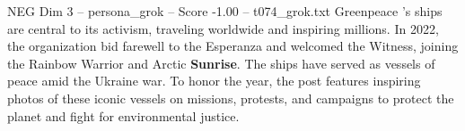 \begin{textsample}{NEG Dim 3 – persona\_grok – Score -1.00 – t074\_grok.txt}  \label{ex:f3_neg_024}
Greenpeace 's ships are central to its activism, traveling worldwide and inspiring millions.
In 2022, the organization bid farewell to the Esperanza and welcomed the Witness, joining the Rainbow Warrior and Arctic \textbf{Sunrise}.
The ships have served as vessels of peace amid the Ukraine war.
To honor the year, the post features inspiring photos of these iconic vessels on missions, protests, and campaigns to protect the planet and fight for environmental justice.

\end{textsample}

